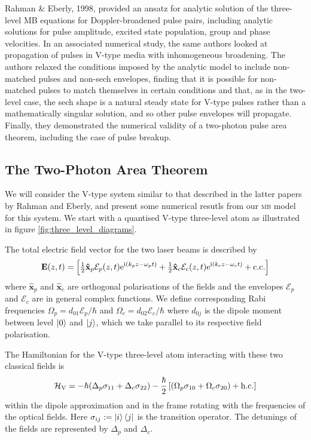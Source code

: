     Rahman \& Eberly, 1998, provided\cite{Rahman1998} an ansatz for analytic
    solution of the three-level MB equations for Doppler-broadened pulse pairs,
    including analytic solutions for pulse amplitude, excited state population,
    group and phase velocities. In an associated numerical study, the same
    authors looked at\cite{Rahman1999} propagation of pulses in V-type media
    with inhomogeneous broadening. The authors relaxed the conditions imposed by
    the analytic model to include non-matched pulses and non-sech envelopes,
    finding that it is possible for non-matched pulses to match themselves in
    certain conditions and that, as in the two-level case, the sech shape is a
    natural steady state for V-type pulses rather than a mathematically singular
    solution, and so other pulse envelopes will propagate. Finally, they
    demonstrated the numerical validity of a two-photon pulse area theorem,
    including the case of pulse breakup.

  \subsection{The Two-Photon Area Theorem}

    We will consider the V-type system similar to that described in the latter
    papers by Rahman and Eberly\cite{Rahman1999}, and present some numerical
    resutls from our \textsc{mb} model for this system. We start with a
    quantised V-type three-level atom as illustrated in figure
    \ref{fig:three_level_diagrams}.

    The total electric field vector for the two laser beams is described by
    \begin{equation}\label{eqn:env_carrier}
      \mathbf{E}(z,t) = \left[ \tfrac{1}{2} \mathbf{\hat{x}}_p 
        \mathcal{E}_p(z,t) \mathrm{e}^{\mathrm{i}(k_p z - \omega_p t)} + 
        \tfrac{1}{2} \mathbf{\hat{x}}_c \mathcal{E}_c(z,t) \mathrm{e}^{\mathrm{i}(k_c z -
        \omega_c t)} + \mathrm{c.c.} \right]
    \end{equation}
    where $\mathbf{\hat{x}}_p$ and $\mathbf{\hat{x}}_c$ are orthogonal
    polarisations of the fields and the envelopes $\mathcal{E}_p$ and
    $\mathcal{E}_c$ are in general complex functions. We define corresponding
    Rabi frequencies $\Omega_p = d_{01}\mathcal{E}_p/\hbar$ and $\Omega_c =
    d_{02}\mathcal{E}_c/\hbar$ where $d_{0j}$ is the dipole moment between level
    $\Ket{0}$ and $\Ket{j}$, which we take parallel to its respective field
    polarisation.

    The Hamiltonian for the V-type three-level atom interacting with these two 
    classical fields is
    \begin{equation}\label{eqn:vee_hamiltonian}
      \mathcal{H}_\mathrm{V} = -\hbar (\Delta_p \sigma_{11} + \Delta_c 
      \sigma_{22}) -\frac{\hbar}{2} 
      \left[ (\Omega_p \sigma_{10} + \Omega_c \sigma_{20} )
      + \mathrm{h.c.} \right]
    \end{equation}
    within the dipole approximation and in the frame rotating with the
    frequencies of the optical fields. Here $\sigma_{ij} := \Ket{i}\Bra{j}$ is
    the transition operator. The detunings of the fields are represented by
    $\Delta_p$ and $\Delta_c$.

